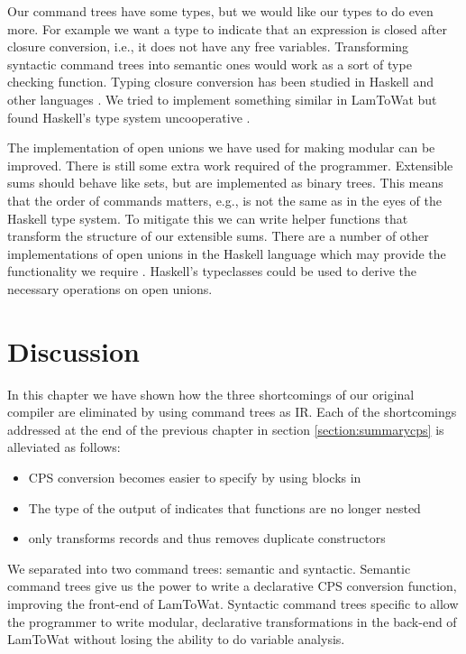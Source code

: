 Our command trees have some types, but we would like our types to do even more. For example we want a type to indicate that an expression is closed after closure conversion, i.e., it does not have any free variables. Transforming syntactic command trees into semantic ones would work as a sort of type checking function. Typing closure conversion has been studied in Haskell and other languages \autocite{DBLP:conf/haskell/GuillemetteM07, DBLP:conf/pldi/Chlipala07, DBLP:conf/popl/MorrisettWCG98}. We tried to implement something similar in LamToWat but found Haskell's type system uncooperative \autocite{10.1145/2578854.2503786}.

The implementation of open unions we have used for making  modular can be improved. There is still some extra work required of the programmer. Extensible sums should behave like sets, but are implemented as binary trees. This means that the order of commands matters, e.g.,  is not the same as  in the eyes of the Haskell type system. To mitigate this we can write helper functions that transform the structure of our extensible sums. There are a number of other implementations of open unions in the Haskell language which may provide the functionality we require \autocite{extensible-effects, open-union}. Haskell's typeclasses could be used to derive the necessary operations on open unions.

\section{\label{section:summarytree}Discussion}
In this chapter we have shown how the three shortcomings of our original compiler are eliminated by using command trees as IR. Each of the shortcomings addressed at the end of the previous chapter in section \ref{section:summarycps} is alleviated as follows: 

\begin{itemize}
\item CPS conversion becomes easier to specify by using blocks in 
\item The type of the output of  indicates that functions are no longer nested
\item {} only transforms records and thus removes duplicate constructors
\end{itemize}

We separated  into two command trees: semantic and syntactic. Semantic command trees give us the power to write a declarative CPS conversion function, improving the front-end of LamToWat. Syntactic command trees specific to  allow the programmer to write modular, declarative transformations in the back-end of LamToWat without losing the ability to do variable analysis.

